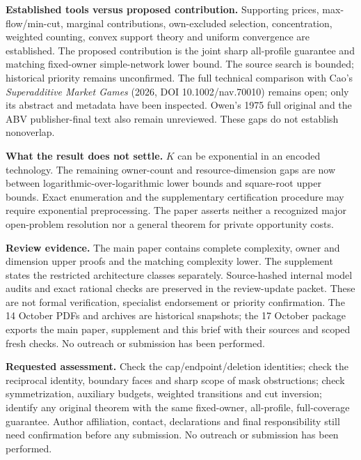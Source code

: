 \documentclass[11pt]{article}
\begin{document}
\textbf{Established tools versus proposed contribution.} Supporting prices,
max-flow/min-cut, marginal contributions, own-excluded selection,
concentration, weighted counting, convex support theory and uniform
convergence are established. The proposed contribution is the joint sharp
all-profile guarantee and matching fixed-owner simple-network lower bound.
The source search is bounded; historical priority remains unconfirmed.
The full technical comparison with Cao's \emph{Superadditive Market Games}
(2026, DOI 10.1002/nav.70010) remains open; only its abstract and metadata
have been inspected. Owen's 1975 full original and the ABV publisher-final
text also remain unreviewed. These gaps do not establish nonoverlap.

\textbf{What the result does not settle.} $K$ can be exponential in an encoded
technology. The remaining owner-count and resource-dimension gaps are now between logarithmic-over-logarithmic lower bounds and square-root upper bounds.
Exact enumeration and the supplementary certification procedure may require
exponential preprocessing. The paper asserts neither a recognized major
open-problem resolution nor a general theorem for private opportunity costs.

\textbf{Review evidence.} The main paper contains complete complexity, owner
and dimension upper proofs and the matching complexity lower. The supplement
states the restricted architecture classes separately. Source-hashed internal
model audits and exact rational checks are preserved in the review-update
packet. These are not formal verification, specialist endorsement or priority
confirmation. The 14 October PDFs and archives are historical snapshots;
the 17 October package exports the main paper, supplement and this brief
with their sources and scoped fresh checks. No outreach or submission has been performed.

\textbf{Requested assessment.} Check the cap/endpoint/deletion identities;
check the reciprocal identity, boundary faces and sharp scope of mask obstructions;
check symmetrization, auxiliary budgets, weighted transitions and cut inversion;
identify any original theorem with the same fixed-owner, all-profile,
full-coverage guarantee. Author affiliation, contact, declarations and final
responsibility still need confirmation before any submission. No outreach
or submission has been performed.
\end{document}
